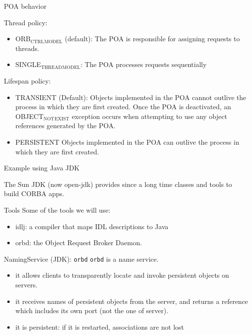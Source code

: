 \documentclass[bigger,hyperref={colorlinks=true, urlcolor=red, plainpages=false, pdfpagelabels, bookmarksnumbered}]{beamer}
\begin{document}
\begin{frame}[label=sec-4-20]{POA behavior}
\begin{block}{Thread policy:}
\begin{itemize}
\item ORB$_{\text{CTRL}}$$_{\text{MODEL}}$ (default): The POA is responsible for assigning requests to threads.
\item SINGLE$_{\text{THREAD}}$$_{\text{MODEL}}$: The POA processes requests sequentially
\end{itemize}
\end{block}

\begin{block}{Lifespan policy:}
\begin{itemize}
\item TRANSIENT (Default): Objects implemented in the POA cannot outlive the process in 
which they are first created. Once the POA is deactivated, an OBJECT$_{\text{NOT}}$$_{\text{EXIST}}$ exception occurs 
when attempting to use any object references generated by the POA.
\item PERSISTENT Objects implemented in the POA can outlive the process in which they are first created.
\end{itemize}
\end{block}
\end{frame}





\begin{frame}[label=sec-4-21]{Example using Java JDK}
\begin{block}{The Sun JDK (now open-jdk) provides since a long time classes and tools to build CORBA apps.}
\end{block}
\begin{block}{Tools}
Some of the tools we will use:
\begin{itemize}
\item idlj: a compiler that maps IDL descriptions to Java
\item orbd: the Object Request Broker Daemon.
\end{itemize}
\end{block}
\end{frame}
\begin{frame}[fragile,label=sec-4-22]{NamingService (JDK): \texttt{orbd}}
 \texttt{orbd} is a name service.
\begin{itemize}
\item it allows clients to transparently locate and invoke persistent objects on servers.
\item it receives names of persistent objects from the server, and returns a reference which includes its own port (not the one of server).
\item it is persistent: if it is restarted, associations are not lost
\end{itemize}
\end{frame}
\end{document}
